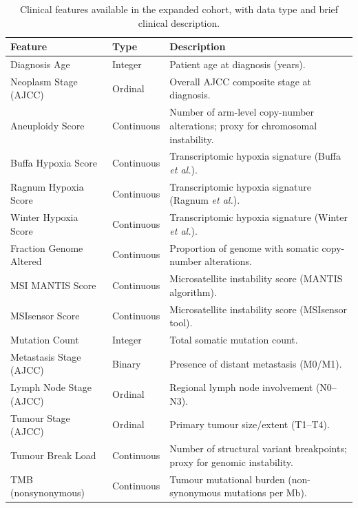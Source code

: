 \begin{table}[!ht]
  \centering
  \caption{Clinical features available in the expanded cohort, with data type
  and brief clinical description.}
  \label{tab:expanded_clinical_features}
  \renewcommand{\arraystretch}{1.3}
  \begin{tabular}{llp{7cm}}
  \hline
  \textbf{Feature} & \textbf{Type} & \textbf{Description} \\
  \hline
  Diagnosis Age & Integer & Patient age at diagnosis (years). \\
  Neoplasm Stage (AJCC) & Ordinal & Overall AJCC composite stage at diagnosis. \\
  Aneuploidy Score & Continuous & Number of arm-level copy-number alterations; proxy for chromosomal instability. \\
  Buffa Hypoxia Score & Continuous & Transcriptomic hypoxia signature (Buffa \textit{et al.}). \\
  Ragnum Hypoxia Score & Continuous & Transcriptomic hypoxia signature (Ragnum \textit{et al.}). \\
  Winter Hypoxia Score & Continuous & Transcriptomic hypoxia signature (Winter \textit{et al.}). \\
  Fraction Genome Altered & Continuous & Proportion of genome with somatic copy-number alterations. \\
  MSI MANTIS Score & Continuous & Microsatellite instability score (MANTIS algorithm). \\
  MSIsensor Score & Continuous & Microsatellite instability score (MSIsensor tool). \\
  Mutation Count & Integer & Total somatic mutation count. \\
  Metastasis Stage (AJCC) & Binary & Presence of distant metastasis (M0/M1). \\
  Lymph Node Stage (AJCC) & Ordinal & Regional lymph node involvement (N0–N3). \\
  Tumour Stage (AJCC) & Ordinal & Primary tumour size/extent (T1–T4). \\
  Tumour Break Load & Continuous & Number of structural variant breakpoints; proxy for genomic instability. \\
  TMB (nonsynonymous) & Continuous & Tumour mutational burden (non-synonymous mutations per Mb). \\
  \hline
  \end{tabular}
\end{table}


